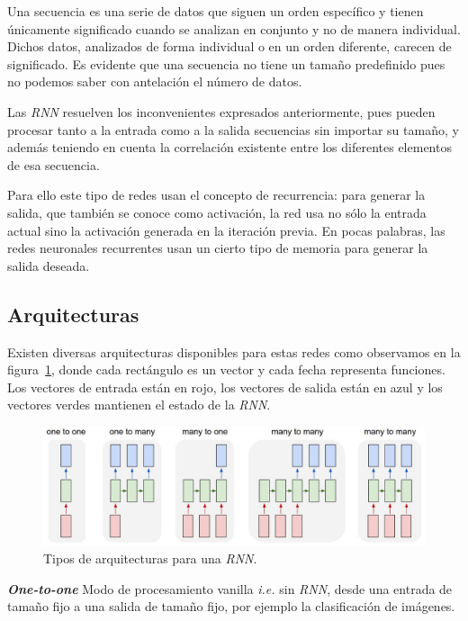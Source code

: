 \documentclass[a4paper,12pt]{article}
\begin{document}
Una secuencia es una serie de datos que siguen un orden específico y tienen únicamente significado cuando se analizan en conjunto y no de manera individual. Dichos datos, analizados de forma individual o en un orden diferente, carecen de significado. Es evidente que una secuencia no tiene un tamaño predefinido pues no podemos saber con antelación el número de datos. 

\clearpage

Las \textit{RNN} resuelven los inconvenientes expresados anteriormente, pues pueden procesar tanto a la entrada como a la salida secuencias sin importar su tamaño, y además teniendo en cuenta la correlación existente entre los diferentes elementos de esa secuencia.

Para ello este tipo de redes usan el concepto de recurrencia: para generar la salida, que también se conoce como activación, la red usa no sólo la entrada actual sino la activación generada en la iteración previa. En pocas palabras, las redes neuronales recurrentes usan un cierto tipo de memoria para generar la salida deseada. 

\subsection{Arquitecturas} \label{rnnarchitecture}
Existen diversas arquitecturas disponibles para estas redes como observamos en la figura~\ref{fig:rnnarch}, donde cada rectángulo es un vector y cada fecha representa funciones. Los vectores de entrada están en rojo, los vectores de salida están en azul y los vectores verdes mantienen el estado de la \textit{RNN}.

\begin{figure}[H]
	\begin{center}				
		\includegraphics[width=1\textwidth]{rnnarch.jpg}
		\caption{Tipos de arquitecturas para una \textit{RNN}. \cite{karpathy:rnn}}
		\label{fig:rnnarch}
	\end{center}
\end{figure}

\textbf{\textit{One-to-one}}
Modo de procesamiento vanilla \textit{i.e.} sin \textit{RNN}, desde una entrada de tamaño fijo a una salida de tamaño fijo, por ejemplo la clasificación de imágenes.
\end{document}

